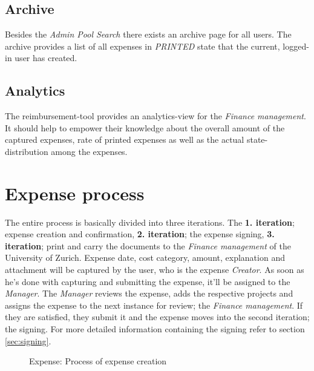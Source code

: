 \subsection{Archive}
Besides the \textit{Admin Pool Search} there exists an archive page for all users. The archive provides a list of all expenses in \textit{PRINTED} state that the current, logged-in user has created.

\subsection{Analytics}
The reimbursement-tool provides an analytics-view for the \textit{Finance management}. It should help to empower their knowledge about the overall amount of the captured expenses, rate of printed expenses as well as the actual state-distribution among the expenses.


\section{Expense process}
\label{sec:process}

The entire process is basically divided into three iterations. The \textbf{1. iteration}; expense creation and confirmation, \textbf{2. iteration}; the expense signing, \textbf{3. iteration}; print and carry the documents to the \textit{Finance management} of the University of Zurich.\newline
Expense date, cost category, amount, explanation and attachment will be captured by the user, who is the expense \textit{Creator}. As soon as he's done with capturing and submitting the expense, it'll be assigned to the \textit{Manager}. The \textit{Manager} reviews the expense, adds the respective projects and assigns the expense to the next instance for review; the \textit{Finance management}. If they are satisfied, they submit it and the expense moves into the second iteration; the signing. For more detailed information containing the signing refer to section \ref{sec:signing}.\newline

\begin{figure}[H]
    \centering
    \caption{Expense: Process of expense creation}
    \label{fig:expense-process}
\end{figure}

